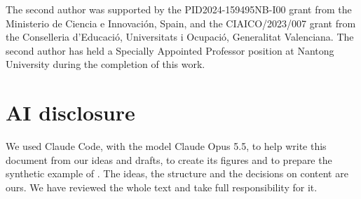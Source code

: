 \documentclass{article}
\begin{document}
The second author was supported by the PID2024-159495NB-I00 grant from the Ministerio de Ciencia e Innovación, Spain, and the CIAICO/2023/007 grant from the Conselleria d'Educació, Universitats i Ocupació, Generalitat Valenciana. The second author has held a Specially Appointed Professor position at Nantong University during the completion of this work.

\section*{AI disclosure}

We used Claude Code, with the model Claude Opus 5.5, to help write this document from our ideas and drafts, to create its figures and to prepare the synthetic example of . The ideas, the structure and the decisions on content are ours. We have reviewed the whole text and take full responsibility for it.
\end{document}
